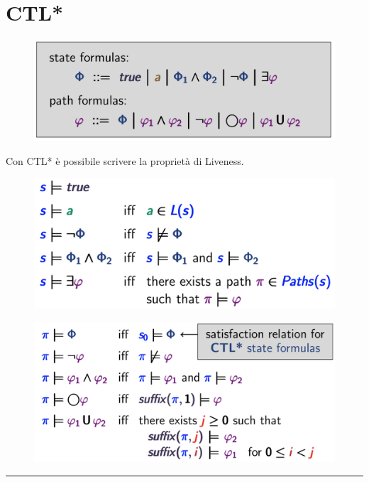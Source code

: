 \documentclass[a4paper, notitlepage, 9pt]{extreport}
\begin{document}
\section*{CTL*}
\begin{multicols}{3}
\begin{figure}[H]
	\centering
	\includegraphics[scale=0.15]{CTL*}
\end{figure}
\noindent
Con CTL* è possibile scrivere la proprietà di Liveness.
\columnbreak
\begin{figure}[H]
	\centering
	\includegraphics[scale=0.15]{STATECTL*}
\end{figure}
\columnbreak
\begin{figure}[H]
	\centering
	\includegraphics[scale=0.15]{PATHCTL*}
\end{figure}
\end{multicols}
\hrule
\end{document}
